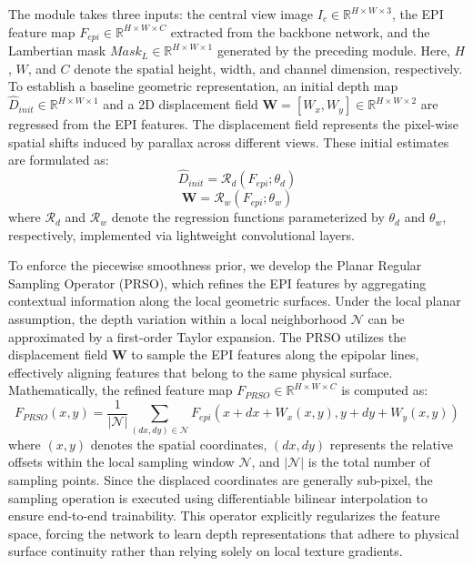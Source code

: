 The module takes three inputs: the central view image $I_c \in \mathbb{R}^{H \times W \times 3}$, the EPI feature map $F_{epi} \in \mathbb{R}^{H \times W \times C}$ extracted from the backbone network, and the Lambertian mask $Mask_L \in \mathbb{R}^{H \times W \times 1}$ generated by the preceding module. Here, $H$, $W$, and $C$ denote the spatial height, width, and channel dimension, respectively. To establish a baseline geometric representation, an initial depth map $\hat{D}_{init} \in \mathbb{R}^{H \times W \times 1}$ and a 2D displacement field $\mathbf{W} = [W_x, W_y] \in \mathbb{R}^{H \times W \times 2}$ are regressed from the EPI features. The displacement field represents the pixel-wise spatial shifts induced by parallax across different views. These initial estimates are formulated as:
\begin{equation}
\label{eq:eq14}
\hat{D}_{init} = \mathcal{R}_d(F_{epi}; \theta_d)
\end{equation}
\begin{equation}
\label{eq:eq15}
\mathbf{W} = \mathcal{R}_w(F_{epi}; \theta_w)
\end{equation}
where $\mathcal{R}_d$ and $\mathcal{R}_w$ denote the regression functions parameterized by $\theta_d$ and $\theta_w$, respectively, implemented via lightweight convolutional layers.

To enforce the piecewise smoothness prior, we develop the Planar Regular Sampling Operator (PRSO), which refines the EPI features by aggregating contextual information along the local geometric surfaces. Under the local planar assumption, the depth variation within a local neighborhood $\mathcal{N}$ can be approximated by a first-order Taylor expansion. The PRSO utilizes the displacement field $\mathbf{W}$ to sample the EPI features along the epipolar lines, effectively aligning features that belong to the same physical surface. Mathematically, the refined feature map $F_{PRSO} \in \mathbb{R}^{H \times W \times C}$ is computed as:
\begin{equation}
\label{eq:eq16}
F_{PRSO}(x,y) = \frac{1}{|\mathcal{N}|} \sum_{(dx,dy) \in \mathcal{N}} F_{epi}\left(x + dx + W_x(x,y), y + dy + W_y(x,y)\right)
\end{equation}
where $(x,y)$ denotes the spatial coordinates, $(dx,dy)$ represents the relative offsets within the local sampling window $\mathcal{N}$, and $|\mathcal{N}|$ is the total number of sampling points. Since the displaced coordinates are generally sub-pixel, the sampling operation is executed using differentiable bilinear interpolation to ensure end-to-end trainability. This operator explicitly regularizes the feature space, forcing the network to learn depth representations that adhere to physical surface continuity rather than relying solely on local texture gradients.

